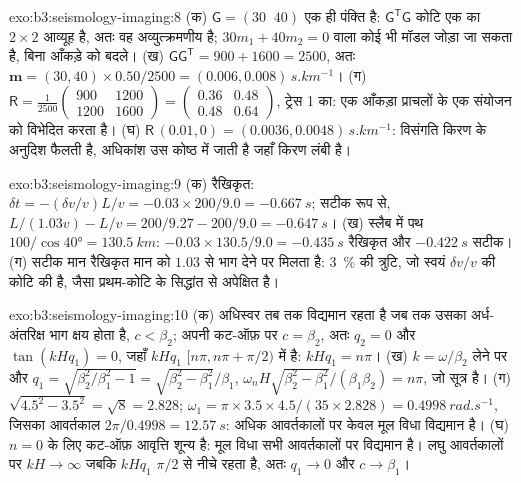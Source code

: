 \begin{solution}{exo:b3:seismology-imaging:8}
(क) $\mathsf G = (30\;\;40)$ एक ही पंक्ति है: $\mathsf G^{\mathsf T}\mathsf G$
कोटि एक का $2\times2$ आव्यूह है, अतः वह अव्युत्क्रमणीय है; $30m_1 + 40m_2 = 0$ वाला कोई भी मॉडल
जोड़ा जा सकता है, बिना आँकड़े को बदले। (ख) $\mathsf G\mathsf G^{\mathsf T} =
900 + 1600 = 2500$, अतः $\mathbf m = (30, 40)\times0.50/2500 =
(0.006, 0.008)\,\unit{s.km^{-1}}$। (ग) $\mathsf R = \frac{1}{2500}
\begin{pmatrix} 900 & 1200 \\ 1200 & 1600 \end{pmatrix} =
\begin{pmatrix} 0.36 & 0.48 \\ 0.48 & 0.64 \end{pmatrix}$, ट्रेस 1 का: एक
आँकड़ा प्राचलों के एक संयोजन को विभेदित करता है। (घ) $\mathsf R\,(0.01, 0) =
(0.0036, 0.0048)\,\unit{s.km^{-1}}$: विसंगति किरण के अनुदिश फैलती है, अधिकांश
उस कोष्ठ में जाती है जहाँ किरण लंबी है।
\end{solution}

\begin{solution}{exo:b3:seismology-imaging:9}
(क) रैखिकृत: $\delta t = -(\delta v/v)L/v = -0.03\times200/9.0 =
\qty{-0.667}{s}$; सटीक रूप से, $L/(1.03v) - L/v = 200/9.27 - 200/9.0 =
\qty{-0.647}{s}$। (ख) स्लैब में पथ $100/\cos\ang{40} =
\qty{130.5}{km}$: $-0.03\times130.5/9.0 = \qty{-0.435}{s}$ रैखिकृत और
$\qty{-0.422}{s}$ सटीक। (ग) सटीक मान रैखिकृत मान को
$1.03$ से भाग देने पर मिलता है: \qty{3}{\percent} की त्रुटि, जो स्वयं $\delta v/v$ की कोटि की है, जैसा
प्रथम-कोटि के सिद्धांत से अपेक्षित है।
\end{solution}

\begin{solution}{exo:b3:seismology-imaging:10}
(क) अधिस्वर तब तक विद्यमान रहता है जब तक उसका अर्ध-अंतरिक्ष भाग क्षय होता है, $c < \beta_2$; अपनी कट-ऑफ़ पर
$c = \beta_2$, अतः $q_2 = 0$ और $\tan(kHq_1) = 0$, जहाँ $kHq_1$
$[n\pi, n\pi + \pi/2)$ में है: $kHq_1 = n\pi$। (ख) $k = \omega/\beta_2$ लेने पर और
$q_1 = \sqrt{\beta_2^2/\beta_1^2 - 1} = \sqrt{\beta_2^2 - \beta_1^2}/\beta_1$,
$\omega_nH\sqrt{\beta_2^2 - \beta_1^2}/(\beta_1\beta_2) = n\pi$, जो
सूत्र है। (ग) $\sqrt{4.5^2 - 3.5^2} = \sqrt8 = 2.828$; $\omega_1 =
\pi\times3.5\times4.5/(35\times2.828) = \qty{0.4998}{rad.s^{-1}}$, जिसका आवर्तकाल
$2\pi/0.4998 = \qty{12.57}{s}$: अधिक आवर्तकालों पर केवल मूल विधा
विद्यमान है। (घ) $n = 0$ के लिए कट-ऑफ़ आवृत्ति शून्य है: मूल विधा
सभी आवर्तकालों पर विद्यमान है। लघु आवर्तकालों पर $kH \to \infty$ जबकि $kHq_1$
$\pi/2$ से नीचे रहता है, अतः $q_1 \to 0$ और $c \to \beta_1$।
\end{solution}

